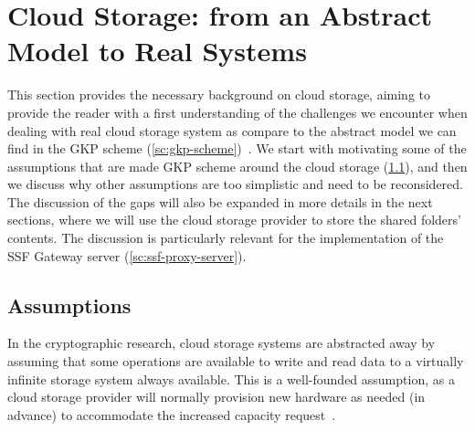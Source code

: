 \section{Cloud Storage: from an Abstract Model to Real Systems}\label{sc:cloud-storage}

This section provides the necessary background on cloud storage,
aiming to provide the reader with a first understanding of the challenges
we encounter when dealing with real cloud storage system
as compare to the abstract model we can find in the GKP scheme (\cref{sc:gkp-scheme})~\cite{GKP}.
We start with motivating some of the assumptions that are made
GKP scheme around the cloud storage (\cref{scc:cloud-storage-assumptions}), and then we discuss why
other assumptions are too simplistic and need to be reconsidered.
The discussion of the gaps will also be expanded in more details in the next sections,
where we will use the cloud storage provider to store the shared folders' contents.
The discussion is particularly relevant for the implementation of the
SSF Gateway server (\cref{sc:ssf-proxy-server}).

\subsection{Assumptions}\label{scc:cloud-storage-assumptions}
In the cryptographic research, cloud storage systems are abstracted away by assuming
that some operations are available to write and read data to a virtually
infinite storage system always available.
This is a well-founded assumption, as a cloud storage provider
will normally provision new hardware as needed (in advance) to accommodate the
increased capacity request~\cite{AzureBlobStorage}.

